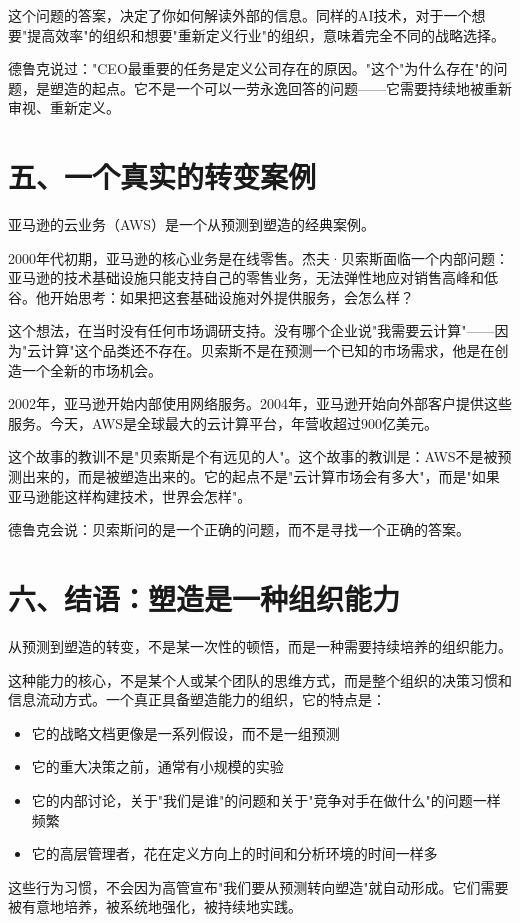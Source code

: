 这个问题的答案，决定了你如何解读外部的信息。同样的AI技术，对于一个想要"提高效率"的组织和想要"重新定义行业"的组织，意味着完全不同的战略选择。

德鲁克说过："CEO最重要的任务是定义公司存在的原因。"这个"为什么存在"的问题，是塑造的起点。它不是一个可以一劳永逸回答的问题——它需要持续地被重新审视、重新定义。


\section{五、一个真实的转变案例}


亚马逊的云业务（AWS）是一个从预测到塑造的经典案例。

2000年代初期，亚马逊的核心业务是在线零售。杰夫·贝索斯面临一个内部问题：亚马逊的技术基础设施只能支持自己的零售业务，无法弹性地应对销售高峰和低谷。他开始思考：如果把这套基础设施对外提供服务，会怎么样？

这个想法，在当时没有任何市场调研支持。没有哪个企业说"我需要云计算"——因为"云计算"这个品类还不存在。贝索斯不是在预测一个已知的市场需求，他是在创造一个全新的市场机会。

2002年，亚马逊开始内部使用网络服务。2004年，亚马逊开始向外部客户提供这些服务。今天，AWS是全球最大的云计算平台，年营收超过900亿美元。

这个故事的教训不是"贝索斯是个有远见的人"。这个故事的教训是：AWS不是被预测出来的，而是被塑造出来的。它的起点不是"云计算市场会有多大"，而是"如果亚马逊能这样构建技术，世界会怎样"。

德鲁克会说：贝索斯问的是一个正确的问题，而不是寻找一个正确的答案。


\section{六、结语：塑造是一种组织能力}


从预测到塑造的转变，不是某一次性的顿悟，而是一种需要持续培养的组织能力。

这种能力的核心，不是某个人或某个团队的思维方式，而是整个组织的决策习惯和信息流动方式。一个真正具备塑造能力的组织，它的特点是：

\begin{itemize}
\item 它的战略文档更像是一系列假设，而不是一组预测
\item 它的重大决策之前，通常有小规模的实验
\item 它的内部讨论，关于"我们是谁"的问题和关于"竞争对手在做什么"的问题一样频繁
\item 它的高层管理者，花在定义方向上的时间和分析环境的时间一样多

\end{itemize}
这些行为习惯，不会因为高管宣布"我们要从预测转向塑造"就自动形成。它们需要被有意地培养，被系统地强化，被持续地实践。

